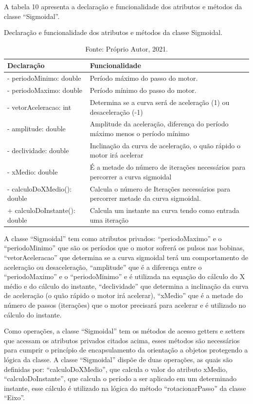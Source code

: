 A tabela 10 apresenta a declaração e funcionalidade dos atributos e métodos da classe “Sigmoidal”.

\begin{table}
    \centering
    \caption{Declaração e funcionalidade dos atributos e métodos da classe Sigmoidal.}
    \begin{tabular}{lp{9cm}}
        \hline
        \textbf{Declaração} & \textbf{Funcionalidade}\\
        \hline
        - periodoMinimo: double & Período máximo do passo do motor.\\
        - periodoMaximo: double & Período mínimo do passo do motor.\\
        - vetorAceleracao: int & Determina se a curva será de aceleração (1) ou desaceleração (-1)\\
        - amplitude: double & Amplitude da aceleração, diferença do período máximo menos o período mínimo\\
        - declividade: double & Inclinação da curva de aceleração, o quão rápido o motor irá acelerar\\
        - xMedio: double & É a metade do número de iterações necessários para percorrer a curva sigmoidal\\
        - calculoDoXMedio(): double & Calcula o número de Iterações necessários para percorrer metade da curva sigmoidal.\\
        + calculoDoInstante(): double & Calcula um instante na curva tendo como entrada uma iteração\\
        \hline       
    \end{tabular}
    \caption*{Fonte: Próprio Autor, 2021.}
    \label{tab:classesigmoidal}
\end{table}

A classe “Sigmoidal” tem como atributos privados: “periodoMaximo” e o “periodoMinimo” que são os períodos 
que o motor sofrerá os pulsos nas bobinas, “vetorAceleracao” que determina se a curva sigmoidal terá 
um comportamento de aceleração ou desaceleração, “amplitude” que é a diferença entre o “periodoMaximo” 
e o “periodoMinimo” e é utilizada na equação do cálculo do X médio e do cálculo do instante, “declividade” 
que determina a inclinação da curva de aceleração (o quão rápido o motor irá acelerar), “xMedio” que é a 
metade do número de passos (iterações) que o motor precisará para acelerar e é utilizado no cálculo 
do instante. 

Como operações, a classe “Sigmoidal” tem os métodos de acesso getters e setters que acessam os atributos 
privados citados acima, esses métodos são necessários para cumprir o princípio de encapsulamento da orientação 
a objetos protegendo a lógica da classe. A classe “Sigmoidal” dispõe de duas operações, as quais são definidas 
por: “calculoDoXMedio”, que calcula o valor do atributo xMedio, “calculoDoInstante”, que calcula o período a 
ser aplicado em um determinado instante, esse cálculo é utilizado na lógica do método “rotacionarPasso” 
da classe “Eixo”.

